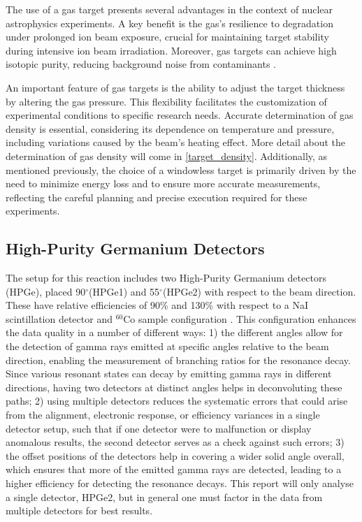 \documentclass[a4paper,12pt]{article}
\begin{document}
The use of a gas target presents several advantages in the context of nuclear astrophysics experiments. A key benefit is the gas's resilience to degradation under prolonged ion beam exposure, crucial for maintaining target stability during intensive ion beam irradiation. Moreover, gas targets can achieve high isotopic purity, reducing background noise from contaminants \cite{Best2016UndergroundNA}.

An important feature of gas targets is the ability to adjust the target thickness by altering the gas pressure. This flexibility facilitates the customization of experimental conditions to specific research needs. Accurate determination of gas density is essential, considering its dependence on temperature and pressure, including variations caused by the beam's heating effect.  More detail about the determination of gas density will come in \ref{target_density}.  Additionally, as mentioned previously, the choice of a windowless target is primarily driven by the need to minimize energy loss and to ensure more accurate measurements, reflecting the careful planning and precise execution required for these experiments.


\subsection{High-Purity Germanium Detectors}\label{HPGE}

The setup for this reaction includes two High-Purity Germanium detectors (HPGe), placed 90$^\circ$(HPGe1) and 55$^\circ$(HPGe2) with respect to the beam direction.  These have relative efficiencies of 90\% and 130\% with respect to a NaI scintillation detector and $^{60}$Co sample configuration \cite{chiara}.  This configuration enhances the data quality in a number of different ways: 1) the different angles allow for the detection of gamma rays emitted at specific angles relative to the beam direction, enabling the measurement of branching ratios for the resonance decay. Since various resonant states can decay by emitting gamma rays in different directions, having two detectors at distinct angles helps in deconvoluting these paths; 2) using multiple detectors reduces the systematic errors that could arise from the alignment, electronic response, or efficiency variances in a single detector setup, such that if one detector were to malfunction or display anomalous results, the second detector serves as a check against such errors; 3) the offset positions of the detectors help in covering a wider solid angle overall, which ensures that more of the emitted gamma rays are detected, leading to a higher efficiency for detecting the resonance decays.  This report will only analyse a single detector, HPGe2, but in general one must factor in the data from multiple detectors for best results.
\end{document}
